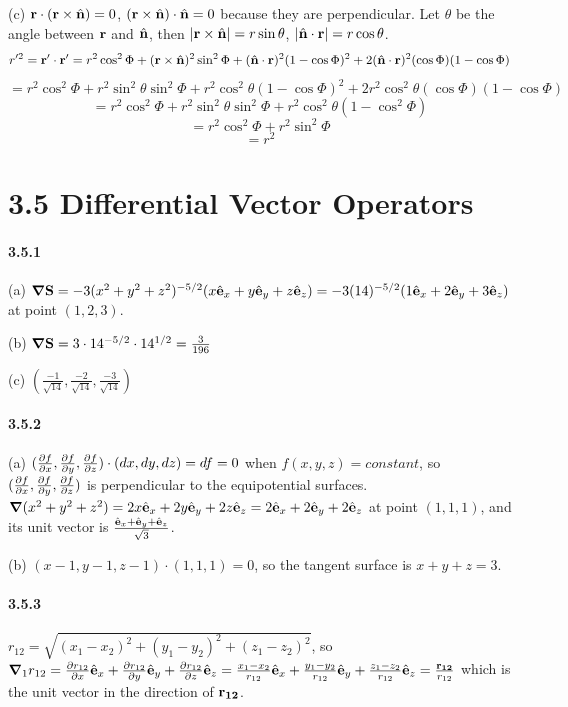 \documentclass[a4paper]{article}
\begin{document}
(c)
$\mathbf{r}\cdot(\mathbf{r}\times\hat{\mathbf{n}})=0$, $(\mathbf{r}\times\hat{\mathbf{n}})\cdot\hat{\mathbf{n}}=0$ because they are perpendicular. Let $\theta$ be the angle between $\mathbf{r}$ and $\hat{\mathbf{n}}$, then $|\mathbf{r}\times\hat{\mathbf{n}}|=r\sin\theta$, $|\hat{\mathbf{n}}\cdot\mathbf{r}|=r\cos\theta$. \[r'^2=\mathbf{r}'\cdot\mathbf{r}'=r^2\cos^2\Phi+(\mathbf{r}\times\hat{\mathbf{n}})^2\sin^2\Phi+(\hat{\mathbf{n}}\cdot\mathbf{r})^2(1-\cos\Phi)^2+2(\hat{\mathbf{n}}\cdot\mathbf{r})^2(\cos\Phi)(1-\cos\Phi)\]
\[
=r^2\cos^2\Phi+r^2\sin^2\theta\sin^2\Phi+r^2\cos^2\theta(1-\cos\Phi)^2+2r^2\cos^2\theta(\cos\Phi)(1-\cos\Phi)
\]
\[=r^2\cos^2\Phi+r^2\sin^2\theta\sin^2\Phi+r^2\cos^2\theta(1-\cos^2\Phi)
\]
\[
=r^2\cos^2\Phi+r^2\sin^2\Phi
\]
\[
=r^2
\]

\section*{3.5 Differential Vector Operators}

\paragraph{3.5.1}
(a) $\boldsymbol{\nabla}\mathbf{S}=-3(x^2+y^2+z^2)^{-5/2}(x\hat{\mathbf{e}}_x+y\hat{\mathbf{e}}_y+z\hat{\mathbf{e}}_z)=-3(14)^{-5/2}(1\hat{\mathbf{e}}_x+2\hat{\mathbf{e}}_y+3\hat{\mathbf{e}}_z)$ at point $(1,2,3)$.

(b) $\boldsymbol{\nabla}\mathbf{S}=3\cdot14^{-5/2}\cdot14^{1/2}=\frac{3}{196}$

(c) $(\frac{-1}{\sqrt{14}},\frac{-2}{\sqrt{14}},\frac{-3}{\sqrt{14}})$

\paragraph{3.5.2}
(a) $(\frac{\partial f}{\partial x},\frac{\partial f}{\partial y},\frac{\partial f}{\partial z})\cdot(dx,dy,dz)=df=0$ when $f(x,y,z)=constant$, so $(\frac{\partial f}{\partial x},\frac{\partial f}{\partial y},\frac{\partial f}{\partial z})$ is perpendicular to the equipotential surfaces. $\boldsymbol{\nabla}(x^2+y^2+z^2)=2x\hat{\mathbf{e}}_x+2y\hat{\mathbf{e}}_y+2z\hat{\mathbf{e}}_z=2\hat{\mathbf{e}}_x+2\hat{\mathbf{e}}_y+2\hat{\mathbf{e}}_z$ at point $(1,1,1)$, and its unit vector is $\frac{\hat{\mathbf{e}}_x+\hat{\mathbf{e}}_y+\hat{\mathbf{e}}_z}{\sqrt{3}}$.

(b) $(x-1,y-1,z-1)\cdot(1,1,1)=0$, so the tangent surface is $x+y+z=3$.

\paragraph{3.5.3}
$r_{12}=\sqrt{(x_1-x_2)^2+(y_1-y_2)^2+(z_1-z_2)^2}$, so $\boldsymbol{\nabla}_1r_{12}=\frac{\partial r_{12}}{\partial x}\hat{\mathbf{e}}_x+\frac{\partial r_{12}}{\partial y}\hat{\mathbf{e}}_y+\frac{\partial r_{12}}{\partial z}\hat{\mathbf{e}}_z=\frac{x_1-x_2}{r_{12}}\hat{\mathbf{e}}_x+\frac{y_1-y_2}{r_{12}}\hat{\mathbf{e}}_y+\frac{z_1-z_2}{r_{12}}\hat{\mathbf{e}}_z=\frac{\mathbf{r_{12}}}{r_{12}}$ which is the unit vector in the direction of $\mathbf{r_{12}}$.
\end{document}
